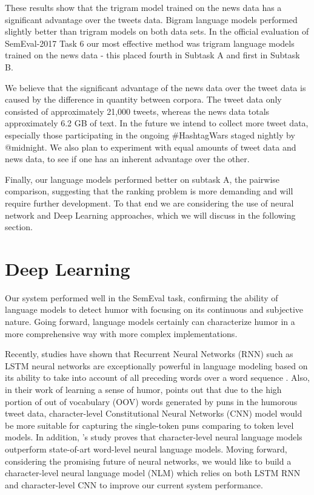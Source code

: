 \documentclass[11pt,a4paper]{article}
\begin{document}
These results show that the trigram model trained on the news data
has a significant advantage over the tweets data. Bigram language
models performed slightly better than trigram models on both data
sets. In the official evaluation of SemEval-2017 Task 6 our most
effective method was trigram language models trained on the news
data - this placed fourth in Subtask A and first in Subtask B.  

We believe that the significant advantage of the news data over 
the tweet data is caused by the difference in quantity between 
corpora. The tweet data only consisted of approximately 21,000 tweets,
whereas the news data totals approximately 6.2 GB of text.
In the future we intend to collect more tweet data, especially those 
participating in the ongoing \#HashtagWars staged nightly by @midnight. 
We also plan to experiment with equal amounts of tweet data and
news data, to see if one has an inherent advantage over the other.

Finally, our language models performed better on subtask A, the pairwise
comparison, suggesting that the ranking problem is more demanding
and will require further development. To that end we are considering the
use of neural network and Deep Learning approaches, which we will 
discuss in the following section.

\section{Deep Learning}

Our system performed well in the SemEval task, confirming the ability 
of language models to detect humor with focusing on its continuous 
and subjective nature. Going forward, language models certainly 
can characterize humor in a more comprehensive way with more 
complex implementations.

Recently, studies have shown that Recurrent Neural Networks 
(RNN) such as LSTM neural networks are exceptionally powerful 
in language modeling based on its ability to take into account 
of all preceding words over a word sequence \cite{LSTM1} 
\cite{LSTM2}. Also, in their work of learning a sense of humor, 
\cite{2016hashtagwars} points out that due to the high portion 
of out of vocabulary (OOV) words generated by puns in the 
humorous tweet data, character-level Constitutional Neural 
Networks (CNN) model would be more suitable for capturing the 
single-token puns comparing to token level models. In addition, 
\cite{CNN}'s study proves that character-level neural language 
models outperform state-of-art word-level neural language 
models. Moving forward, considering the promising future of 
neural networks, we would like to build a character-level neural 
language model (NLM) which relies on both LSTM RNN and character-level 
CNN to improve our current system performance.
\end{document}
